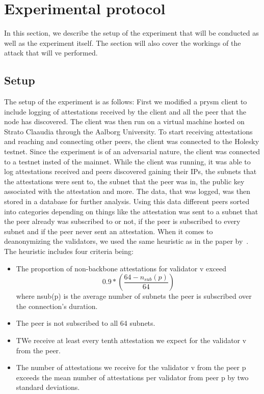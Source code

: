 

\section{Experimental protocol}\label{sec:experimental-protocol}
In this section, we describe the setup of the experiment that will be conducted as well as the experiment itself.
The section will also cover the workings of the attack that will ve performed.

\subsection{Setup}\label{subsec:setup}
The setup of the experiment is as follows: First we modified a prysm client to include logging of attestations received by the client and all the peer that the node has discovered.
The client was then run on a virtual machine hosted on Strato Claaudia through the Aalborg University.
To start receiving attestations and reaching and connecting other peers, the client was connected to the Holesky testnet.
Since the experiment is of an adversarial nature, the client was connected to a testnet insted of the mainnet.
While the client was running, it was able to log attestations received and peers discovered gaining their IPs, the subnets that the attestations were sent to, the subnet that the peer was in, the public key associated with the attestation and more.
The data, that was logged, was then stored in a database for further analysis.
Using this data different peers sorted into categories depending on things like the attestation was sent to a subnet that the peer already was subscribed to or not, if the peer is subscribed to every subnet and if the peer never sent an attestation.
When it comes to deanonymizing the validators, we used the same heuristic as in the paper by~\cite{heimbach2024deanonymizingethereumvalidatorsp2p}. 
The heuristic includes four criteria being:
\begin{itemize}
    \item The proportion of non-backbone attestations for validator v exceed
    \begin{equation}
                                                                                 0.9*\left(\frac{64-n_{sub}(p)}{64}\right)
                                                                                 \label{eq:heurestic}
    \end{equation} where nsub(p) is the average number of subnets the peer is subscribed over the connection’s duration.
    \item The peer is not subscribed to all 64 subnets.
    \item TWe receive at least every tenth attestation we expect for the validator v from the peer.
    \item The number of attestations we receive for the validator v from the peer p exceeds the mean number of attestations per validator from peer p by two standard deviations.
\end{itemize}
